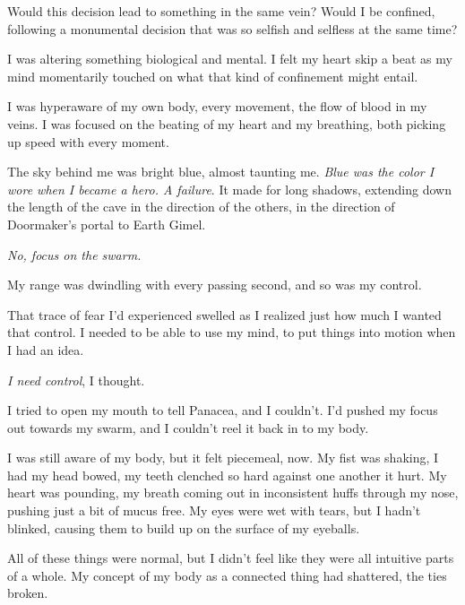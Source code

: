 Would this decision lead to something in the same vein?  Would I be confined, following a monumental decision that was so selfish and selfless at the same time?



I was altering something biological and mental.  I felt my heart skip a beat as my mind momentarily touched on what that kind of confinement might entail.



I was hyperaware of my own body, every movement, the flow of blood in my veins.  I was focused on the beating of my heart and my breathing, both picking up speed with every moment.



The sky behind me was bright blue, almost taunting me.  \emph{Blue was the color I wore when I became a hero.  A failure}.  It made for long shadows, extending down the length of the cave in the direction of the others, in the direction of Doormaker's portal to Earth Gimel.



\emph{No, focus on the swarm.}



My range was dwindling with every passing second, and so was my control.



That trace of fear I'd experienced swelled as I realized just how much I wanted that control.  I needed to be able to use my mind, to put things into motion when I had an idea.



\emph{I need control}, I thought.



I tried to open my mouth to tell Panacea, and I couldn't.  I'd pushed my focus out towards my swarm, and I couldn't reel it back in to my body.



I was still aware of my body, but it felt piecemeal, now.  My fist was shaking, I had my head bowed, my teeth clenched so hard against one another it hurt.  My heart was pounding, my breath coming out in inconsistent huffs through my nose, pushing just a bit of mucus free.  My eyes were wet with tears, but I hadn't blinked, causing them to build up on the surface of my eyeballs.



All of these things were normal, but I didn't feel like they were all intuitive parts of a whole.  My concept of my body as a connected thing had shattered, the ties broken.



